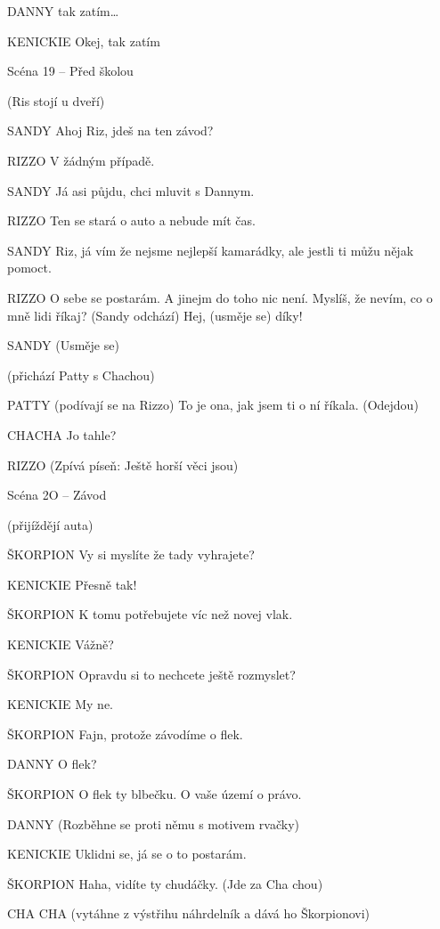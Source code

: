DANNY        tak zatím…

KENICKIE        Okej, tak zatím 





Scéna 19 – Před školou 

(Ris stojí u dveří)

SANDY        Ahoj Riz, jdeš na ten závod?

RIZZO        V žádným případě.

SANDY        Já asi půjdu, chci mluvit s Dannym.

RIZZO        Ten se stará o auto a nebude mít čas. 

SANDY        Riz, já vím že nejsme nejlepší kamarádky, ale jestli ti můžu nějak                 pomoct.

RIZZO        O sebe se postarám. A jinejm do toho nic není. Myslíš, že nevím, co o         mně lidi říkaj? (Sandy odchází) Hej, (usměje se) díky! 

SANDY        (Usměje se) 

(přichází Patty s Chachou) 

PATTY        (podívají se na Rizzo) To je ona, jak jsem ti o ní říkala. (Odejdou)

CHACHA            Jo tahle?

RIZZO        (Zpívá píseň: Ještě horší věci jsou) 

Scéna 2O  – Závod 

(přijíždějí auta) 

ŠKORPION        Vy si myslíte že tady vyhrajete?

KENICKIE        Přesně tak! 

ŠKORPION        K tomu potřebujete víc než novej vlak. 

KENICKIE        Vážně?

ŠKORPION        Opravdu si to nechcete ještě rozmyslet?

KENICKIE        My ne.

ŠKORPION        Fajn, protože závodíme o flek. 

DANNY        O flek? 

ŠKORPION        O flek ty blbečku. O vaše území o právo. 

DANNY        (Rozběhne se proti němu s motivem rvačky) 

KENICKIE        Uklidni se, já se o to postarám. 

ŠKORPION        Haha, vidíte ty chudáčky. (Jde za Cha chou) 

CHA CHA        (vytáhne z výstřihu náhrdelník a dává ho Škorpionovi)

